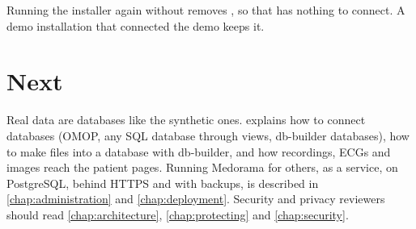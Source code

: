 Running the installer again without  removes , so
that  has nothing to connect. A demo installation that connected the demo
keeps it.

\section{Next}
\label{sec:quickstart-next}

Real data are databases like the synthetic ones.  explains how to connect
databases (OMOP, any SQL database through views, db-builder databases), how to make files into a
database with db-builder, and how recordings, ECGs and images reach the patient pages. Running Medorama for others, as
a service, on PostgreSQL, behind HTTPS and with backups, is described in
\cref{chap:administration} and \cref{chap:deployment}. Security and privacy reviewers should read
\cref{chap:architecture}, \cref{chap:protecting} and \cref{chap:security}.
